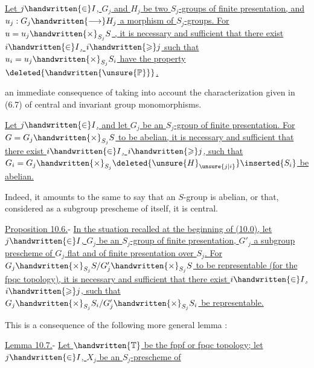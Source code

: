 



 \uline{Let $j\handwritten{\in}I$, $G_j$ and $H_j$ be two $S_j$-groups of finite presentation, and $u_j:G_j\handwritten{\longrightarrow}H_j$ a morphism of $S_j$-groups. For $u=u_j\handwritten{\times}_{S_j}S$  }\uline{, it is necessary and sufficient that there exist $i\handwritten{\in}I$, $i\handwritten{\geqslant}j$ such that $u_i=u_j\handwritten{\times}_{S_j}S_i$ have the property $\deleted{\handwritten{\unsure{\mathbb{P}}}}$.}

 an immediate consequence of  taking into account the characterization given in (6.7) of central and invariant group monomorphisms.

  \uline{Let $j\handwritten{\in}I$, and let $G_j$ be an $S_j$-group of finite presentation. For $G=G_j\handwritten{\times}_{S_j}S$ to be abelian, it is necessary and sufficient that there exist $i\handwritten{\in}I$, $i\handwritten{\geqslant}j$, such that $G_i=G_j\handwritten{\times}_{S_j}\deleted{\unsure{H}_{\unsure{j|i}}}\inserted{S_i}$ be abelian.}

Indeed, it amounts to the same to say that an $S$-group is abelian, or that, considered as a subgroup prescheme of itself, it is central.

\uline{Proposition 10.6.}- \uline{In the stuation recalled at the beginning of (10.0), let $j\handwritten{\in}I$, $G_j$ be an $S_j$-group of finite presentation, $G'_j$ a subgroup prescheme of $G_j$ flat and of finite presentation over $S_j$. For $G_j\handwritten{\times}_{S_j}S/G'_j\handwritten{\times}_{S_j}S$ to be representable (for the fpqc topology), it is necessary and sufficient that there exist $i\handwritten{\in}I$, $i\handwritten{\geqslant}j$, such that $G_j\handwritten{\times}_{S_j}S_i/G'_j\handwritten{\times}_{S_j}S_i$ be representable.}

This is a consequence of the following more general lemma :

\uline{Lemma 10.7.}- \uline{Let $\handwritten{\mathbb{T}}$ be the fppf or fpqc topology; let $j\handwritten{\in}I$, $X_j$ be an $S_j$-prescheme of}
